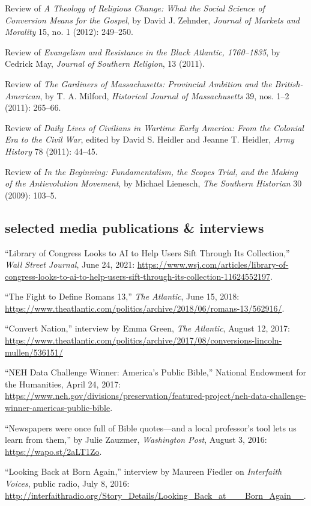\documentclass[11pt]{article}
\begin{document}
Review of \emph{A Theology of Religious Change: What the Social Science
  of Conversion Means for the Gospel}, by David J. Zehnder, \emph{Journal
  of Markets and Morality} 15, no. 1 (2012): 249--250.

Review of \emph{Evangelism and Resistance in the Black Atlantic,
  1760--1835}, by Cedrick May, \emph{Journal of Southern Religion}, 13
(2011).

Review of \emph{The Gardiners of Massachusetts: Provincial Ambition and
  the British-American}, by T. A. Milford, \emph{Historical Journal of
  Massachusetts} 39, nos. 1--2 (2011): 265--66.

Review of \emph{Daily Lives of Civilians in Wartime Early America: From
  the Colonial Era to the Civil War}, edited by David S. Heidler and
Jeanne T. Heidler, \emph{Army History} 78 (2011): 44--45.

Review of \emph{In the Beginning: Fundamentalism, the Scopes Trial, and
  the Making of the Antievolution Movement}, by Michael Lienesch,
\emph{The Southern Historian} 30 (2009): 103--5.

\subsection{selected media publications \& interviews}\label{public}

``Library of Congress Looks to AI to Help Users Sift Through Its Collection,'' \emph{Wall Street Journal}, June 24, 2021: \url{https://www.wsj.com/articles/library-of-congress-looks-to-ai-to-help-users-sift-through-its-collection-11624552197}.

``The Fight to Define Romans 13,'' \emph{The Atlantic}, June 15, 2018: \url{https://www.theatlantic.com/politics/archive/2018/06/romans-13/562916/}.

``Convert Nation,'' interview by Emma Green, \emph{The Atlantic}, August 12, 
2017: \url{https://www.theatlantic.com/politics/archive/2017/08/conversions-lincoln-mullen/536151/}

``NEH Data Challenge Winner: America's Public Bible,'' National Endowment for 
the Humanities, April 24, 2017: 
\url{https://www.neh.gov/divisions/preservation/featured-project/neh-data-challenge-winner-americas-public-bible}.

``Newspapers were once full of Bible quotes---and a local professor's tool lets 
us learn from them,'' by Julie Zauzmer, \emph{Washington Post}, August 3, 2016: 
\url{https://wapo.st/2aLT1Zo}.

``Looking Back at Born Again,'' interview by Maureen Fiedler on \emph{Interfaith Voices}, public 
radio, July 8, 2016:  
\url{http://interfaithradio.org/Story_Details/Looking_Back_at___Born_Again__}.
\end{document}
